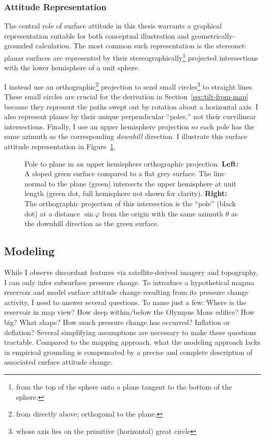 \subsubsection{Attitude Representation}\label{sec:attitude-representation}

The central role of surface attitude in this thesis warrants a graphical representation suitable for both conceptual illustration and geometrically-grounded calculation. The most common such representation is the stereonet: planar surfaces are represented by their stereographically\footnote{from the top of the sphere onto a plane tangent to the bottom of the sphere.} projected intersections with the lower hemisphere of a unit sphere.

I instead use an orthographic\footnote{from directly above; orthogonal to the plane.} projection to send small circles\footnote{whose axis lies on the primitive (horizontal) great circle} to straight lines. These small circles are crucial for the derivation in Section~\ref{sec:tilt-from-map} because they represent the paths swept out by rotation about a horizontal axis. I also represent planes by their unique perpendicular ``poles,'' not their curvilinear intersections. Finally, I use an upper hemisphere projection so each pole has the same azimuth as the corresponding \emph{downhill} direction. I illustrate this surface attitude representation in Figure~\ref{fig:surface}.

\begin{figure}
    \caption[Orthographic pole to plane]{Pole to plane in an upper hemisphere orthographic projection. \textbf{Left:} A sloped green surface compared to a flat grey surface. The line normal to the plane (green) intersects the upper hemisphere at unit length (green dot, full hemisphere not shown for clarity). \textbf{Right:} The orthographic projection of this intersection is the ``pole'' (black dot) at a distance $\sin\varphi$ from the origin with the same azimuth $\theta$ as the downhill direction as the green surface.}%
    \label{fig:surface}%
\end{figure}

\subsection{Modeling}\label{sec:modeling-considerations}

While I observe discordant features via satellite-derived imagery and topography, I can only infer subsurface pressure change. To introduce a hypothetical magma reservoir and model surface attitude change resulting from its pressure change activity, I need to answer several questions. To name just a few: Where is the reservoir in map view? How deep within/below the Olympus Mons edifice? How big? What shape? How much pressure change has occurred? Inflation or deflation? Several simplifying assumptions are necessary to make these questions tractable. Compared to the mapping approach, what the modeling approach lacks in empirical grounding is compensated by a precise and complete description of associated surface attitude change.

